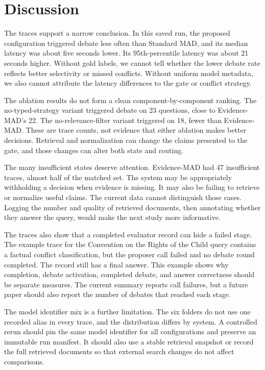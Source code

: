 \documentclass[conference]{IEEEtran}
\begin{document}
\section{Discussion}
The traces support a narrow conclusion. In this saved run, the proposed configuration triggered debate less often than Standard MAD, and its median latency was about five seconds lower. Its 95th-percentile latency was about 21 seconds higher. Without gold labels, we cannot tell whether the lower debate rate reflects better selectivity or missed conflicts. Without uniform model metadata, we also cannot attribute the latency differences to the gate or conflict strategy.

The ablation results do not form a clean component-by-component ranking. The no-typed-strategy variant triggered debate on 23 questions, close to Evidence-MAD's 22. The no-relevance-filter variant triggered on 18, fewer than Evidence-MAD. These are trace counts, not evidence that either ablation makes better decisions. Retrieval and normalization can change the claims presented to the gate, and those changes can alter both state and routing.

The many insufficient states deserve attention. Evidence-MAD had 47 insufficient traces, almost half of the matched set. The system may be appropriately withholding a decision when evidence is missing. It may also be failing to retrieve or normalize useful claims. The current data cannot distinguish those cases. Logging the number and quality of retrieved documents, then annotating whether they answer the query, would make the next study more informative.

The traces also show that a completed evaluator record can hide a failed stage. The example trace for the Convention on the Rights of the Child query contains a factual conflict classification, but the proposer call failed and no debate round completed. The record still has a final answer. This example shows why completion, debate activation, completed debate, and answer correctness should be separate measures. The current summary reports call failures, but a future paper should also report the number of debates that reached each stage.

The model identifier mix is a further limitation. The six folders do not use one recorded alias in every trace, and the distribution differs by system. A controlled rerun should pin the same model identifier for all configurations and preserve an immutable run manifest. It should also use a stable retrieval snapshot or record the full retrieved documents so that external search changes do not affect comparisons.
\end{document}
